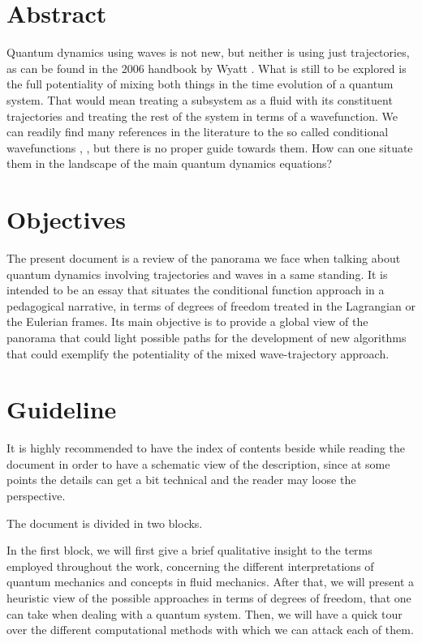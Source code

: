 \documentclass[11pt, a4paper]{article} %
\begin{document}
%
\pagestyle{empty}

\section*{Abstract}
Quantum dynamics using waves is not new, but neither is using just trajectories, as can be found in the 2006 handbook by Wyatt \cite{Wyatt}. What is still to be explored is the full potentiality of mixing both things in the time evolution of a quantum system. That would mean treating a subsystem as a fluid with its constituent trajectories and treating the rest of the system in terms of a wavefunction. We can readily find many references in the literature to the so called conditional wavefunctions \cite{conditional1}, \cite{conditional2}, but there is no proper guide towards them. How can one situate them in the landscape of the main quantum dynamics equations?



\section*{Objectives}\vspace{-0.2cm}
The present document is a review of the panorama we face when talking about quantum dynamics involving trajectories and waves in a same standing. It is intended to be an essay that situates the conditional function approach in a pedagogical narrative, in terms of degrees of freedom treated in the Lagrangian or the Eulerian frames. Its main objective is to provide a global view of the panorama that could light possible paths for the development of new algorithms that could exemplify the potentiality of the mixed wave-trajectory approach.


\section*{Guideline}\vspace{-0.2cm}

It is highly recommended to have the index of contents beside while reading the document in order to have a schematic view of the description, since at some points the details can get a bit technical and the reader may loose the perspective.

The document is divided in two blocks.

 In the first block, we will first give a brief qualitative insight to the terms employed throughout the work, concerning the different interpretations of quantum mechanics and concepts in fluid mechanics. After that, we will present a heuristic view of the possible approaches in terms of degrees of freedom, that one can take when dealing with a quantum system. Then, we will have a quick tour over the different computational methods with which we can attack each of them. 
\end{document}

